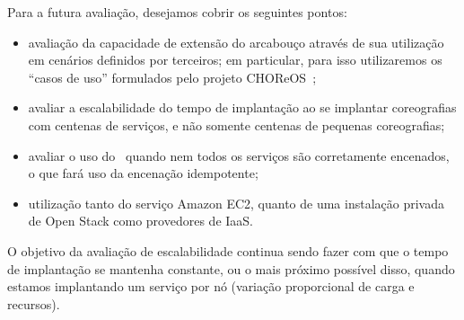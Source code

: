 Para a futura avaliação, desejamos cobrir os seguintes pontos:

\begin{itemize}
\item avaliação da capacidade de extensão do arcabouço através de sua utilização em cenários definidos por terceiros; em particular, para isso utilizaremos os ``casos de uso'' formulados pelo projeto CHOReOS~\cite{Choreos2011D6.1, Choreos2011D8.1};
\item avaliar a escalabilidade do tempo de implantação ao se implantar coreografias com centenas de serviços, e não somente centenas de pequenas coreografias;
\item avaliar o uso do \ee\ quando nem todos os serviços são corretamente encenados, o que fará uso da encenação idempotente;
\item utilização tanto do serviço Amazon EC2, quanto de uma instalação privada de Open Stack como provedores de IaaS.
\end{itemize}

O objetivo da avaliação de escalabilidade continua sendo fazer com que o tempo de implantação se mantenha constante, ou o mais próximo possível disso, quando estamos implantando um serviço por nó (variação proporcional de carga e recursos).
